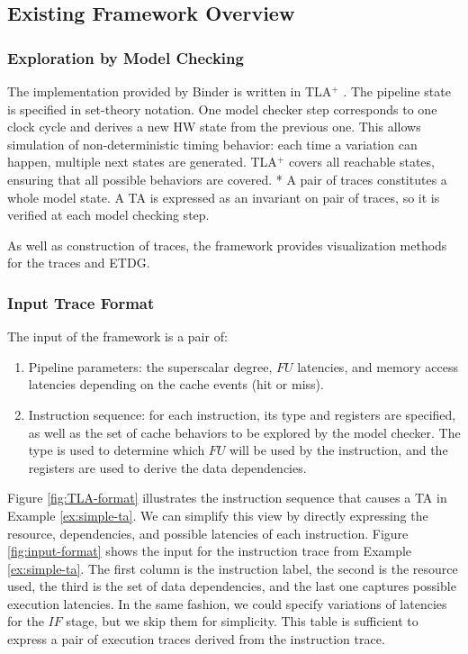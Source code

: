 \subsection{Existing Framework Overview}

\subsubsection{Exploration by Model Checking}

The implementation provided by Binder is written in TLA$^+$ \cite{lamport_specifying_2003}. The pipeline state is specified in set-theory notation. One model checker step corresponds to one clock cycle and derives a new HW state from the previous one. This allows simulation of non-deterministic timing behavior: each time a variation can happen, multiple next states are generated. TLA$^+$ covers all reachable states, ensuring that all possible behaviors are covered.
*
A pair of traces constitutes a whole model state. A TA is expressed as an invariant on pair of traces, so it is verified at each model checking step.

As well as construction of traces, the framework provides visualization methods for the traces and ETDG.


\subsubsection{Input Trace Format}

The input of the framework is a pair of:
\begin{enumerate}
    \item Pipeline parameters: the superscalar degree, $FU$ latencies, and memory access latencies depending on the cache events (hit or miss).
    \item Instruction sequence: for each instruction, its type and registers are specified, as well as the set of cache behaviors to be explored by the model checker. The type is used to determine which $FU$ will be used by the instruction, and the registers are used to derive the data dependencies.
\end{enumerate}

Figure \ref{fig:TLA-format} illustrates the instruction sequence that causes a TA in Example \ref{ex:simple-ta}. We can simplify this view by directly expressing the resource, dependencies, and possible latencies of each instruction. Figure \ref{fig:input-format} shows the input for the instruction trace from Example \ref{ex:simple-ta}. The first column is the instruction label, the second is the resource used, the third is the set of data dependencies, and the last one captures possible execution latencies. In the same fashion, we could specify variations of latencies for the $IF$ stage, but we skip them for simplicity. This table is sufficient to express a pair of execution traces derived from the instruction trace.

